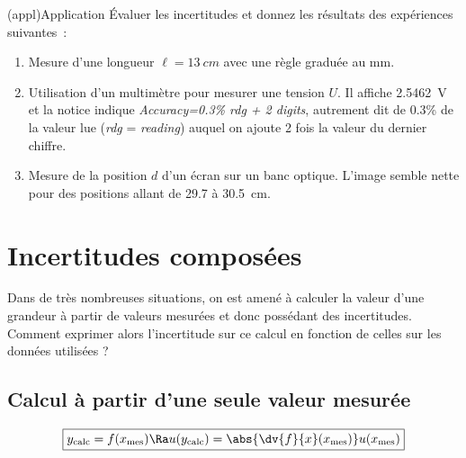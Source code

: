 \documentclass[../main/main.tex]{subfiles}
\begin{document}
\begin{tcb}(appl){Application}
	Évaluer les incertitudes et donnez les résultats des expériences suivantes~:
	\begin{enumerate}
		\item Mesure d'une longueur $\ell = \SI{13}{cm}$ avec une règle graduée au
		      \si{mm}.
		      \smallbreak
		      \vspace*{-20pt}
		\item Utilisation d'un multimètre pour mesurer une tension $U$. Il affiche
		      \SI{2.5462}{V} et la notice indique \textit{Accuracy=0.3\% rdg + 2
			      digits}, autrement dit de \num{0.3}\% de la valeur lue (\textit{rdg} =
		      \textit{reading}) auquel on ajoute 2 fois la valeur du dernier chiffre.
		      \smallbreak
		      \vspace*{-20pt}
		\item Mesure de la position $d$ d'un écran sur un banc optique. L'image
		      semble nette pour des positions allant de \num{29.7} à \SI{30.5}{cm}.
		      \smallbreak
		      \vspace*{-20pt}
	\end{enumerate}
\end{tcb}

\section{Incertitudes composées}
Dans de très nombreuses situations, on est amené à calculer la valeur d'une
grandeur à partir de valeurs mesurées et donc possédant des incertitudes.
Comment exprimer alors l'incertitude sur ce calcul en fonction de celles sur les
données utilisées ?

\subsection{Calcul à partir d'une seule valeur mesurée}
\[
	\boxed{y_{\rm calc} = f(x_{\rm mes}) \Ra u(y_{\rm calc}) =
		\abs{\dv{f}{x}(x_{\rm mes})}u(x_{\rm mes})}
\]
\end{document}
